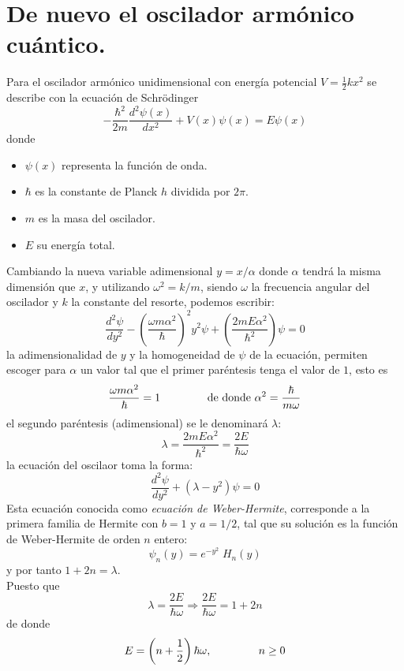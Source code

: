 \section{De nuevo el oscilador armónico cuántico.}
Para el oscilador armónico unidimensional con energía potencial $V = \frac{1}{2} k x^{2}$ se describe con la ecuación de Schrödinger
\[ - \dfrac{\hbar^{2}}{2m} \dfrac{d^{2} \psi(x)}{d x^{2}} +  V(x) \psi(x) =  E \psi(x) \]
donde
\begin{itemize}
\item $\psi(x)$ representa la función de onda.
\item $\hbar$ es la constante de Planck $h$ dividida por $2 \pi$.
\item $m$ es la masa del oscilador.
\item $E$ su energía total.
\end{itemize}
Cambiando la nueva variable adimensional $y = x / \alpha$ donde $\alpha$ tendrá la misma dimensión que $x$, y utilizando $\omega^{2} =  k /m$, siendo $\omega$ la frecuencia angular del oscilador y $k$ la constante del resorte, podemos escribir:
\[ \dfrac{d^{2} \psi}{d y^{2}} - \left( \dfrac{\omega m \alpha^{2}}{\hbar} \right)^{2} y^{2} \psi  + \left( \dfrac{2m E \alpha^{2}}{\hbar^{2}} \right) \psi = 0 \]
la adimensionalidad de $y$ y la homogeneidad de $\psi$ de la ecuación, permiten escoger para $\alpha$ un valor tal que el primer paréntesis tenga el valor de $1$, esto es
\[ \dfrac{\omega m \alpha^{2}}{\hbar} = 1 \hspace{1.5cm} \text{de donde } \alpha^{2} = \dfrac{\hbar}{m \omega} \]
el segundo paréntesis (adimensional) se le denominará $\lambda$:
\[ \lambda = \dfrac{2 m E \alpha^{2}}{\hbar^{2}} = \dfrac{2 E}{\hbar \omega} \]
la ecuación del oscilaor toma la forma:
\begin{equation}
\dfrac{d^{2} \psi}{d y^{2}} + (\lambda - y^{2}) \psi = 0
\label{eq:ecuacion_08_66}
\end{equation}
Esta ecuación conocida como \emph{ecuación de Weber-Hermite}, corresponde a la primera familia de Hermite con $b=1$ y $a=1/2$, tal que su solución es la función de Weber-Hermite de orden $n$ entero:
\begin{equation}
\psi_{n}(y) = e^{-y^{2}} \; H_{n}(y)
\label{eq:ecuacion_08_67}
\end{equation}
y por tanto $1 + 2n = \lambda$.
\\
Puesto que
\[ \lambda = \dfrac{2 E}{\hbar \omega} \Rightarrow \dfrac{2 E }{\hbar \omega} = 1 + 2n \]
de donde
\begin{equation}
E = \left(n + \dfrac{1}{2} \right) \hbar \omega, \hspace{1.5cm} n \geq 0
\label{eq:ecuacion_08_68}
\end{equation}
